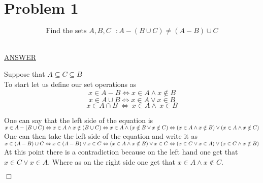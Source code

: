 \documentclass[12pt]{article}
\begin{document}
\maketitle

\section*{Problem 1}\label{Problem 1}
\begin{center}
        $$
                \text{Find the sets } A,B,C \text{ } : A - (B \cup C) \neq (A-B) \cup C
        $$\\
\end{center}
\underline{ANSWER} \\
\begin{center}
        Suppose that $A \subseteq C \subseteq B$ \\
        To start let us define our set operations as\\
        $$
                x \in A - B \iff x \in A \land x \notin B
        $$
        $$
                x \in A \cup B \iff x \in A \lor x \in B
        $$
        $$
                x \in A \cap B \ \iff \ x \in A \land \ x \in B
        $$
\end{center}
One can say that the left side of the equation is\\

\begin{math}
        x \in A - (B\cup C) \Leftrightarrow \\
        x \in A \land x \notin (B \cup C) \Leftrightarrow \\
        x \in A \land (x \notin B \lor x \notin C) \Leftrightarrow\\
        (x \in A \land x \notin B) \lor (x \in A \land x \notin C) \\
\end{math}\\
One can then take the left side of the equation and write it as \\
\begin{math}
        x \in (A-B)\cup C \Leftrightarrow \\
        x \in (A-B) \lor x \in C \Leftrightarrow \\
        (x \in A \land x \notin B) \lor x \in C \Leftrightarrow \\
        (x \in C \lor x \in A) \lor (x \in C \land x \notin B)
\end{math}\\
At this point there is a contradiction because on the left hand one get that $x \in C \lor x \in A$. Where as on the right side one get that $x \in A \land x \notin C$.\\
\begin{flushright}
        $\Box$
\end{flushright}
\end{document}
